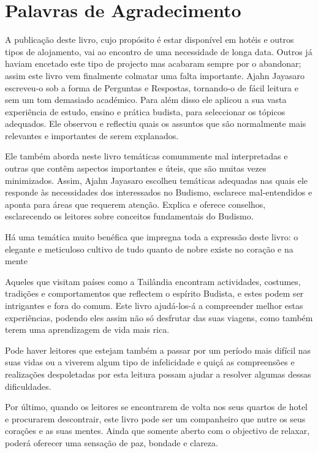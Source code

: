 \clearpage
\chapter{Palavras de Agradecimento}

{\fontsize{10.5}{13.5}\selectfont

A publicação deste livro, cujo propósito é estar disponível em hotéis e outros
tipos de alojamento, vai ao encontro de uma necessidade de longa data. Outros já
haviam encetado este tipo de projecto mas acabaram sempre por o abandonar; assim
este livro vem finalmente colmatar uma falta importante. Ajahn Jayasaro
escreveu-o sob a forma de Perguntas e Respostas, tornando-o de fácil leitura e
sem um tom demasiado académico. Para além disso ele aplicou a sua vasta
experiência de estudo, ensino e prática budista, para seleccionar os tópicos
adequados. Ele observou e reflectiu quais os assuntos que são normalmente mais
relevantes e importantes de serem explanados.

Ele também aborda neste livro temáticas comummente mal interpretadas e outras
que contêm aspectos importantes e úteis, que são muitas vezes minimizados.
Assim, Ajahn Jayasaro escolheu temáticas adequadas nas quais ele responde às
necessidades dos interessados no Budismo, esclarece mal-entendidos e aponta para
áreas que requerem atenção. Explica e oferece conselhos, esclarecendo os
leitores sobre conceitos fundamentais do Budismo.

Há uma temática muito benéfica que impregna toda a expressão deste livro: o
elegante e meticuloso cultivo de tudo quanto de nobre existe no coração e na
mente

Aqueles que visitam países como a Tailândia encontram actividades, costumes,
tradições e comportamentos que reflectem o espírito Budista, e estes podem ser
intrigantes e fora do comum. Este livro ajudá-los-á a compreender melhor estas
experiências, podendo eles assim não só desfrutar das suas viagens, como também
terem uma aprendizagem de vida mais rica.

Pode haver leitores que estejam também a passar por um período mais difícil nas
suas vidas ou a viverem algum tipo de infelicidade e quiçá as compreensões e
realizações despoletadas por esta leitura possam ajudar a resolver algumas
dessas dificuldades.

Por último, quando os leitores se encontrarem de volta nos seus quartos de hotel
e procurarem descontrair, este livro pode ser um companheiro que nutre os seus
corações e as suas mentes. Ainda que somente aberto com o objectivo de relaxar,
poderá oferecer uma sensação de paz, bondade e clareza.

}

